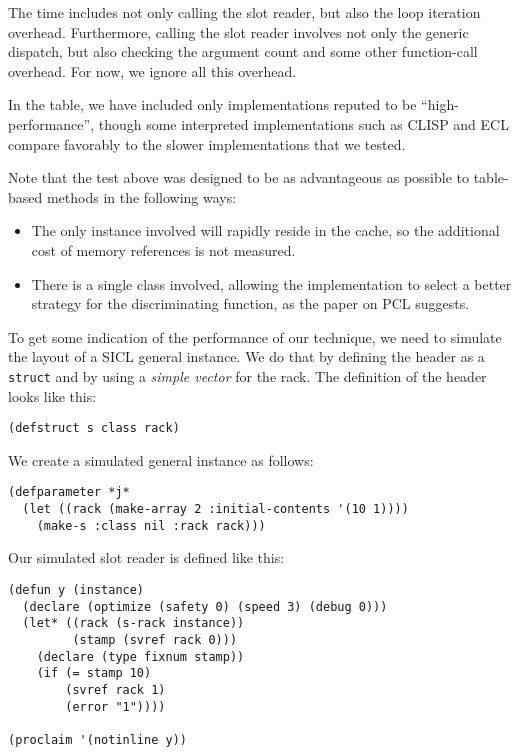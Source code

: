 The time includes not only calling the slot reader, but also the loop
iteration overhead.  Furthermore, calling the slot reader involves not
only the generic dispatch, but also checking the argument count and
some other function-call overhead.  For now, we ignore all this
overhead.

In the table, we have included only implementations reputed to be
``high-performance'', though some interpreted implementations such as
CLISP and ECL compare favorably to the slower implementations that we
tested. 

Note that the test above was designed to be as advantageous as
possible to table-based methods in the following ways:

\begin{itemize}
\item The only instance involved will rapidly reside in the cache, so
  the additional cost of memory references is not measured.
\item There is a single class involved, allowing the implementation to
  select a better strategy for the discriminating function, as the
  paper on PCL suggests. 
\end{itemize}

To get some indication of the performance of our technique, we need to
simulate the layout of a SICL general instance.  We do that by
defining the header as a \cl{} \texttt{struct} and by using a
\emph{simple vector} for the rack.  The definition of the header looks
like this:

\begin{verbatim}
(defstruct s class rack)
\end{verbatim}

We create a simulated general instance as follows:

\begin{verbatim}
(defparameter *j* 
  (let ((rack (make-array 2 :initial-contents '(10 1))))
    (make-s :class nil :rack rack)))
\end{verbatim}

Our simulated slot reader is defined like this:

\begin{verbatim}
(defun y (instance)
  (declare (optimize (safety 0) (speed 3) (debug 0)))
  (let* ((rack (s-rack instance))
         (stamp (svref rack 0)))
    (declare (type fixnum stamp))
    (if (= stamp 10)
        (svref rack 1)
        (error "1"))))

(proclaim '(notinline y))
\end{verbatim}

